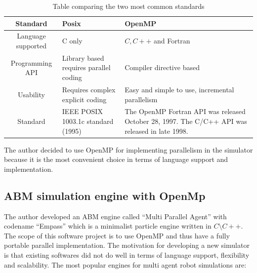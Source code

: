 \begin{table}[htbp]
\centering
\begin{tabular}{| c| p{3.5 cm} | p{3.5 cm} |}
\hline
Standard & Posix & OpenMP \\
\hline
Language supported & C only & $C,C++$ and Fortran\\
\hline
Programming API & Library based requires parallel coding & Compiler directive based \\
\hline
Usability & Requires complex explicit coding & Easy and simple to use, incremental parallelism \\
\hline
Standard & IEEE POSIX 1003.1c standard (1995) & The OpenMP Fortran API was released October 28, 1997. The C/C++ API was released in late 1998.  \\
\hline
\end{tabular}
\caption[Posix vs OpenMP standard]{Table comparing the two most common standards}
\label{tab:Parallel:comparison}
\end{table}

The author decided to use OpenMP for implementing parallelism in the simulator
because it is the most convenient choice in terms of language support and
implementation.
\subsection{ABM simulation engine with OpenMp}
The author developed an ABM engine called ``Multi Parallel Agent'' with codename
``Empass'' which is a minimalist particle engine written in $C \setminus C++$.
The scope of this software project is to use OpenMP and thus have a fully
portable parallel implementation.
The motivation for developing a new simulator is that existing softwares did not
do well in terms of language support, flexibility and scalability.
The most popular engines for multi agent robot simulations are:

